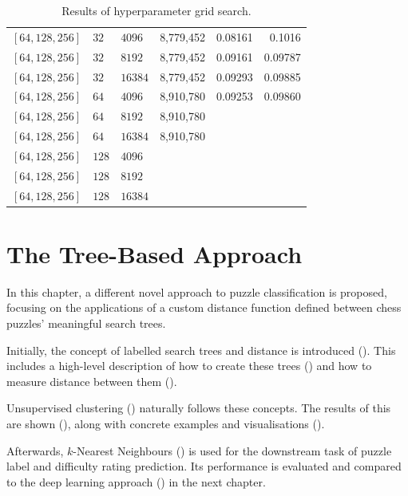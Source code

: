 \begin{table}[H]
\begin{adjustbox}{width=\textwidth}
\begin{tabular}{lll|rrr}
      $[64, 128, 256 ]$& $32$ & $4096$ & 8,779,452 & 0.08161 & 0.1016 \\
      $[64, 128, 256 ]$& $32$ & $8192$ & 8,779,452 & 0.09161 & 0.09787 \\
      $[64, 128, 256 ]$& $32$ & $16384$ & 8,779,452 & 0.09293 & 0.09885 \\[0.1cm]

      $[64, 128, 256 ]$& $64$ & $4096$ & 8,910,780 & 0.09253 & 0.09860 \\
      $[64, 128, 256 ]$& $64$ & $8192$ & 8,910,780 && \\
      $[64, 128, 256 ]$& $64$ & $16384$ & 8,910,780 && \\[0.1cm]

      $[64, 128, 256 ]$& $128$  & $4096$ & && \\
      $[64, 128, 256 ]$& $128$ & $8192$ & && \\
      $[64, 128, 256 ]$& $128$ & $16384$ & && \\

    \end{tabular}
  \end{adjustbox}
  \caption{Results of hyperparameter grid search.}
  \label{tabHyperparam}
\end{table}














\chapter{The Tree-Based Approach}\label{treeChapter}

In this chapter, a different novel approach to puzzle classification is
proposed, focusing on the applications of a custom distance function defined
between chess puzzles' meaningful search trees.

Initially, the concept of labelled search trees and distance is introduced
(). This includes a high-level description of how to create these
trees () and how to measure distance between them
().

Unsupervised clustering () naturally follows these concepts. The
results of this are shown (), along with concrete examples and
visualisations ().

Afterwards, $k$-Nearest Neighbours () is used for the downstream
task of puzzle label and difficulty rating prediction. Its performance is
evaluated and compared to the deep learning approach () in the
next chapter.


